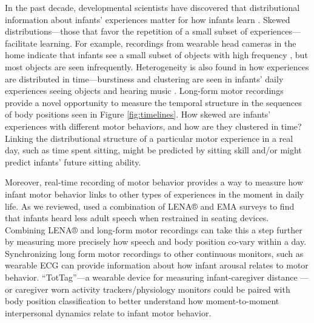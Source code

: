 \documentclass[
  man]{apa6}
\begin{document}
In the past decade, developmental scientists have discovered that distributional information about infants' experiences matter for how infants learn \autocite{ClerkinHart2017,KachergisYu2017,RazAbney2019}. Skewed distributions---those that favor the repetition of a small subset of experiences---facilitate learning. For example, recordings from wearable head cameras in the home indicate that infants see a small subset of objects with high frequency \autocite{ClerkinHart2017}, but most objects are seen infrequently. Heterogeneity is also found in how experiences are distributed in time---burstiness and clustering are seen in infants' daily experiences seeing objects and hearing music \autocite{MendozaFausey2022,CasillasElliott2021}. Long-form motor recordings provide a novel opportunity to measure the temporal structure in the sequences of body positions seen in Figure \ref{fig:timelines}. How skewed are infants' experiences with different motor behaviors, and how are they clustered in time? Linking the distributional structure of a particular motor experience in a real day, such as time spent sitting, might be predicted by sitting skill and/or might predict infants' future sitting ability.

Moreover, real-time recording of motor behavior provides a way to measure how infant motor behavior links to other types of experiences in the moment in daily life. As we reviewed, \textcite{MalachowskiSalo2023} used a combination of LENA® and EMA surveys to find that infants heard less adult speech when restrained in seating devices. Combining LENA® and long-form motor recordings can take this a step further by measuring more precisely how speech and body position co-vary within a day. Synchronizing long form motor recordings to other continuous monitors, such as wearable ECG \autocite{WassPhillips2022} can provide information about how infant arousal relates to motor behavior. ``TotTag''---a wearable device for measuring infant-caregiver distance \autocite{SaloPannuto2022}---or caregiver worn activity trackers/physiology monitors could be paired with body position classification to better understand how moment-to-moment interpersonal dynamics relate to infant motor behavior.
\end{document}
